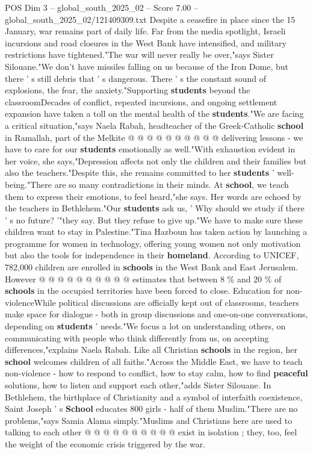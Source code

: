 \begin{textsample}{POS Dim 3 – global\_south\_2025\_02 – Score 7.00 – global\_south\_2025\_02/121409309.txt}
Despite a ceasefire in place since the 15 January, war remains part of daily life.
Far from the media spotlight, Israeli incursions and road closures in the West Bank have intensified, and military restrictions have tightened."The war will never really be over,"says Sister Silouane."We don't have missiles falling on us because of the Iron Dome, but there ' s still debris that ' s dangerous.
There ' s the constant sound of explosions, the fear, the anxiety."Supporting \textbf{students} beyond the classroomDecades of conflict, repeated incursions, and ongoing settlement expansion have taken a toll on the mental health of the \textbf{students}."We are facing a critical situation,"says Naela Rabah, headteacher of the Greek-Catholic \textbf{school} in Ramallah, part of the Melkite @ @ @ @ @ @ @ @ @ @ delivering lessons - we have to care for our \textbf{students} emotionally as well."With exhaustion evident in her voice, she says,"Depression affects not only the children and their families but also the teachers."Despite this, she remains committed to her \textbf{students} ' well-being."There are so many contradictions in their minds.
At \textbf{school}, we teach them to express their emotions, to feel heard,"she says.
Her words are echoed by the teachers in Bethlehem."Our \textbf{students} ask us, ' Why should we study if there ' s no future? '"they say.
But they refuse to give up."We have to make sure these children want to stay in Palestine."Tina Hazboun has taken action by launching a programme for women in technology, offering young women not only motivation but also the tools for independence in their \textbf{homeland}.
According to UNICEF, 782,000 children are enrolled in \textbf{schools} in the West Bank and East Jerusalem.
However @ @ @ @ @ @ @ @ @ @ estimates that between 8 \% and 20 \% of \textbf{schools} in the occupied territories have been forced to close.
Education for non-violenceWhile political discussions are officially kept out of classrooms, teachers make space for dialogue - both in group discussions and one-on-one conversations, depending on \textbf{students} ' needs."We focus a lot on understanding others, on communicating with people who think differently from us, on accepting differences,"explains Naela Rabah.
Like all Christian \textbf{schools} in the region, her \textbf{school} welcomes children of all faiths."Across the Middle East, we have to teach non-violence - how to respond to conflict, how to stay calm, how to find \textbf{peaceful} solutions, how to listen and support each other,"adds Sister Silouane.
In Bethlehem, the birthplace of Christianity and a symbol of interfaith coexistence, Saint Joseph ' s \textbf{School} educates 800 girls - half of them Muslim."There are no problems,"says Samia Alama simply."Muslims and Christians here are used to talking to each other @ @ @ @ @ @ @ @ @ @ exist in isolation ; they, too, feel the weight of the economic crisis triggered by the war.

\end{textsample}
